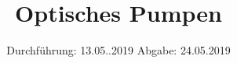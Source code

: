 

\subject{VERSUCH NUMMER 21}
\title{Optisches Pumpen}
\date{
  Durchführung: 13.05..2019
  \hspace{3em}
  Abgabe: 24.05.2019
}



\thispagestyle{empty}
\maketitle
\thispagestyle{empty}
\tableofcontents
\newpage
\setcounter{page}{1}


% 




\nocite{*}
\printbibliography


